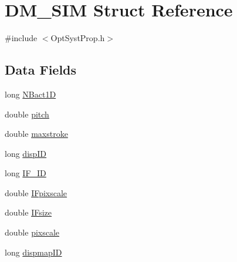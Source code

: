 \hypertarget{structDM__SIM}{\section{D\+M\+\_\+\+S\+I\+M Struct Reference}
\label{structDM__SIM}
}


{\ttfamily \#include $<$Opt\+Syst\+Prop.\+h$>$}

\subsection*{Data Fields}
\begin{DoxyCompactItemize}
\item 
long \hyperlink{structDM__SIM_a2ce1ee098755e4e7996951cd71d8976b}{N\+Bact1\+D}
\item 
double \hyperlink{structDM__SIM_ade1c585e1ec4dff6446ba9e8349082d0}{pitch}
\item 
double \hyperlink{structDM__SIM_abecbaa72dee8fc92256ae7368e4f48fb}{maxstroke}
\item 
long \hyperlink{structDM__SIM_ad28647e0691a0a6b54bfa067440e1d07}{disp\+I\+D}
\item 
long \hyperlink{structDM__SIM_ab3183170476668b48742599ae0cbe13d}{I\+F\+\_\+\+I\+D}
\item 
double \hyperlink{structDM__SIM_ae8a6e022b1624fb1bf4a24ff0b9ef2f3}{I\+Fpixscale}
\item 
double \hyperlink{structDM__SIM_aa8b4a0fcd937d4c731addce143f22544}{I\+Fsize}
\item 
double \hyperlink{structDM__SIM_a88f9258d3a795e433186d8ae4b77a418}{pixscale}
\item 
long \hyperlink{structDM__SIM_a76765b58c6894d63c3ad371f69ebaa42}{dispmap\+I\+D}
\end{DoxyCompactItemize}


